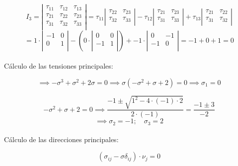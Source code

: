 \documentclass[a4paper,12pt,twoside,final,spanish]{article}
\begin{document}
\[
I_{3}=
\left|
\begin{matrix}
\tau_{11} & \tau_{12} & \tau_{13} \\
\tau_{21} & \tau_{22} & \tau_{23} \\
\tau_{31} & \tau_{32} & \tau_{33} \\
\end{matrix}
\right|
=
\tau_{11}
\left|\begin{matrix}
\tau_{22} & \tau_{23} \\
\tau_{32} & \tau_{33} \\
\end{matrix}\right|
-
\tau_{12}
\left|\begin{matrix}
\tau_{21} & \tau_{23} \\
\tau_{31} & \tau_{33} \\
\end{matrix}\right|
+
\tau_{13}
\left|\begin{matrix}
\tau_{21} & \tau_{22} \\
\tau_{31} & \tau_{32} \\
\end{matrix}\right|
\]
\[
=
1\cdot
\left|\begin{matrix}
-1 & 0 \\
0 & 1 \\
\end{matrix}\right|
-
\left(
0\cdot
\left|\begin{matrix}
0 & 0 \\
-1 & 1 \\
\end{matrix}\right|\right)
+
-1\cdot
\left|\begin{matrix}
0 & -1 \\
-1 & 0 \\
\end{matrix}\right|
=-1+0+1=0
\]\\

Cálculo de las tensiones principales:

\[
\implies -\sigma^{3}+\sigma^{2}+2\sigma=0
\implies \sigma(-\sigma^{2}+\sigma+2)=0 \implies \sigma_{1}=0
\]

\[
-\sigma^{2}+\sigma+2=0
\implies \frac{-1\pm\sqrt{1^{2}-4\cdot (-1)\cdot 2}}{2\cdot(-1)}
=\frac{-1\pm 3}{-2}
\]
\[
\implies \sigma_{2}=-1;\quad \sigma_{3}=2
\]\\

Cálculo de las direcciones principales:

\[
(\sigma_{ij}-\sigma\delta_{ij})\cdot\nu_{j}=0
\]
\end{document}

